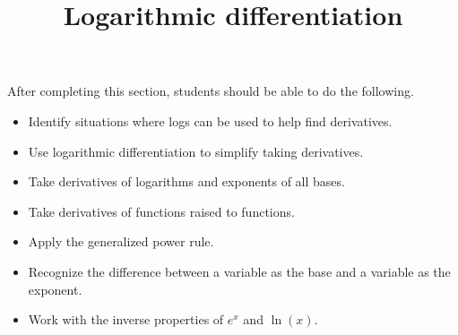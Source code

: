 \documentclass{ximera}
\title{Logarithmic differentiation}
\begin{document}
\begin{abstract}
\end{abstract}

\maketitle

\begin{sectionOutcomes}

After completing this section, students should be able to do the following.

\begin{itemize}
	\item Identify situations where logs can be used to help find derivatives.
	\item Use logarithmic differentiation to simplify taking derivatives.
	\item Take derivatives of logarithms and exponents of all bases.
	\item Take derivatives of functions raised to functions.
	\item Apply the generalized power rule.
	\item Recognize the difference between a variable as the base and a variable as the exponent.
	\item Work with the inverse properties of $e^x$ and $\ln(x)$.
\end{itemize}

\end{sectionOutcomes}
\end{document}
